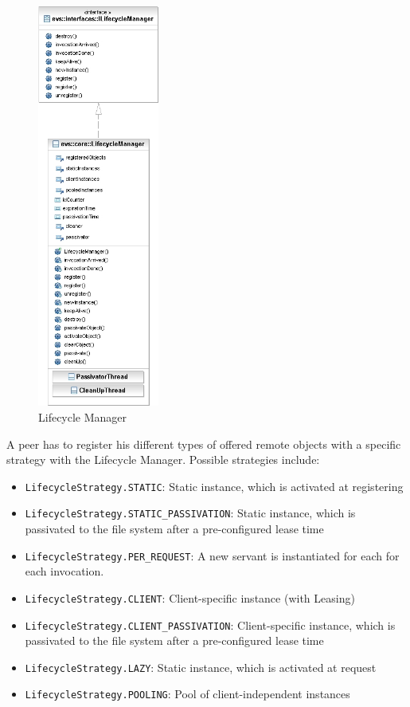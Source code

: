 \begin{figure}[ht!]
	\centering\includegraphics[width=4cm]{uml/LifeCycleManager.jpg} 
	\caption{Lifecycle Manager}
	\label{fig:lifecycle}
\end{figure}

A peer has to register his different types of offered remote objects with a specific strategy with the Lifecycle Manager. Possible strategies include:

\begin{itemize} 
\item \texttt{LifecycleStrategy.STATIC}: Static instance, which is activated at registering
\item \texttt{LifecycleStrategy.STATIC\_PASSIVATION}: Static instance, which is passivated to the file system after a pre-configured lease time
\item \texttt{LifecycleStrategy.PER\_REQUEST}: A new servant is instantiated for each for each invocation.
\item \texttt{LifecycleStrategy.CLIENT}: Client-specific instance (with Leasing)
\item \texttt{LifecycleStrategy.CLIENT\_PASSIVATION}: Client-specific instance, which is passivated to the file system after a pre-configured lease time
\item \texttt{LifecycleStrategy.LAZY}: Static instance, which is activated at request
\item \texttt{LifecycleStrategy.POOLING}: Pool of client-independent instances
\end{itemize}

